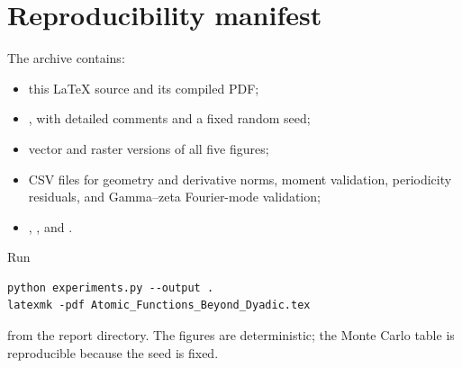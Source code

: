 \documentclass[11pt,oneside]{article}
\theoremstyle{definition}
\theoremstyle{remark}
\begin{document}
\section{Reproducibility manifest}
\label{app:reproducibility}

The archive contains:
\begin{itemize}
\item this LaTeX source and its compiled PDF;
\item {}, with detailed comments and a fixed random seed;
\item vector and raster versions of all five figures;
\item CSV files for geometry and derivative norms, moment validation, periodicity residuals,
      and Gamma--zeta Fourier-mode validation;
\item {}, , and .
\end{itemize}
Run
\begin{lstlisting}[style=pseudo]
python experiments.py --output .
latexmk -pdf Atomic_Functions_Beyond_Dyadic.tex
\end{lstlisting}
from the report directory.  The figures are deterministic; the Monte Carlo table is
reproducible because the seed is fixed.
\end{document}
